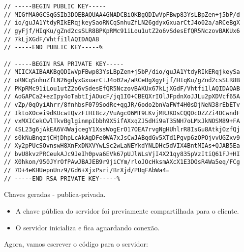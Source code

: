 \documentclass[a4paper,12pt]{article}
\begin{document}
\begin{listing}[!ht]
\begin{verbatim}
// -----BEGIN PUBLIC KEY-----
// MIGfMA0GCSqGSIb3DQEBAQUAA4GNADCBiQKBgQDIwVpFBwp83YsLBpZen+j5bP/d
// io/guJA1YtdyRIkERqjkeySaoRNCqSnhuZfLN26gdyxGxuarCtJ4o02a/aRCeBgX
// gyFjf/HIqKu/gZnd2csSLR8BPKpRMc91iLou1utZ2o6vSdesEfQR5NczovBAKUx6
// 7kLjXGdF/Vhtfi1lAQIDAQAB
// -----END PUBLIC KEY-----%                                                                                                                         

// -----BEGIN RSA PRIVATE KEY-----
// MIICXAIBAAKBgQDIwVpFBwp83YsLBpZen+j5bP/dio/guJA1YtdyRIkERqjkeySa
// oRNCqSnhuZfLN26gdyxGxuarCtJ4o02a/aRCeBgXgyFjf/HIqKu/gZnd2csSLR8B
// PKpRMc91iLou1utZ2o6vSdesEfQR5NczovBAKUx67kLjXGdF/Vhtfi1lAQIDAQAB
// AoGAPCa2+ezIpy4oTabtIjAOucF/jq1IO+CBEQXrIOlJFpdnXoJJLu2pXDVcf65A
// vZp/0qOyiAhrr/8fnhbsF079SodRc+qgJR/6odo2bnVaFWf4H0sDjNeN38rEbETv
// IktoXOcei9dKUcwIQvzFIHI8cz/VuAgcO6MT9LKvjMRJKDsCQQDcOZZZi4OCwndF
// vxMXICekCwlTkvBglginmpIbbh9X5ifAXxqZJ5dHi9aT35NH7oLMxJkNOSM89+FA
// 4SL23g6jAkEA6V4WajcegY1XssWogErO17OEA7rvgNgHUhlrR8IsGu8AtkjOzfQj
// s0kNuBngzjCHjDhpLcAkAgDFe0WA7xJsCwJABqdGv5XTd1Pgvp6zOPOjvvUGZxv9
// Xy2pPUcSOvnswH8XnFxDNXVYwLSc2wLaNEYkdYNLDHc5dVIX4BntMIAs+QJAB5Ea
// bvU8kvzPRCeukAJc9JeIh0pva6EVk67pUJlWLsVjI4X21qy835pVzItiQ61FJ+HI
// X0hkon/950JYrOfPAwJBAJEB9r9jiCYm/rloJOcHksmAXcX1E3DOsR4Wa5eq/FCg
// 7D+4eKHUepnUnz9/Gd6+XjxPsri/BrXjd/PUqFAbWa4=
// -----END RSA PRIVATE KEY-----%

\end{verbatim}
\caption{Chaves geradas - publica-privada.}
\end{listing}

\newpage
\newpage


\begin{itemize}
\item A chave p\'ublica do servidor foi previamente compartilhada para o cliente.
\item O servidor inicializa e fica aguardando conex\~ao.
\end{itemize}

Agora, vamos escrever o c\'odigo para o servidor:
\end{document}
